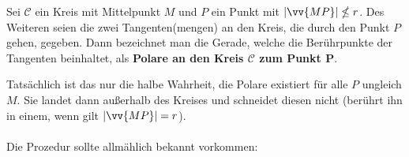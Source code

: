\documentclass[main.tex]{subfiles}
\begin{document}
            \begin{Definition}
                \paragraph{} Sei $\mathscr{C}$ ein Kreis mit Mittelpunkt $M$ und $P$ ein Punkt mit $|\vv{MP}| \nleq r$. Des Weiteren seien die zwei Tangenten(mengen) an den Kreis, die durch den Punkt $P$ gehen, gegeben. Dann bezeichnet man die Gerade, welche die Berührpunkte der Tangenten beinhaltet, als \textbf{Polare an den Kreis $\mathscr{C}$ zum Punkt P}.
            \end{Definition}

            \begin{Bemerkung}
                Tatsächlich ist das nur die halbe Wahrheit, die Polare existiert für alle $P$ ungleich $M$. Sie landet dann außerhalb des Kreises und schneidet diesen nicht (berührt ihn in einem, wenn gilt $|\vv{MP}| = r$).
            \end{Bemerkung}

            \paragraph{} Die Prozedur sollte allmählich bekannt vorkommen:
\end{document}
